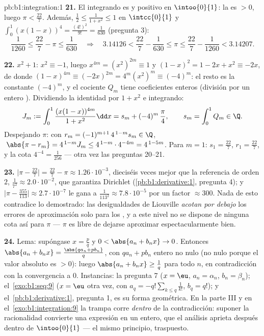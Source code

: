 \begin{solution}{pb:b1:integration:1}
\textbf{21.} El integrando es  y positivo en
$\intoo{0}{1}$: la  es $> 0$, luego $\pi < \frac{22}{7}$.
Además, $\frac12 \leq \frac{1}{1+x^2} \leq 1$ en $\intcc{0}{1}$ y
$\int_0^1 (x(1-x))^4 = \frac{(4!)^2}{9!} = \frac{1}{630}$
(pregunta 3):
\[
\frac{1}{1260} \leq \frac{22}{7} - \pi \leq \frac{1}{630}
\quad\Longrightarrow\quad
3.14126 < \frac{22}{7} - \frac{1}{630} \leq \pi \leq
\frac{22}{7} - \frac{1}{1260} < 3.14207 .
\]

\textbf{22.}  $x^2 + 1$: $x^2 \equiv -1$, luego
$x^{4m} = (x^2)^{2m} \equiv 1$ y
$(1 - x)^2 = 1 - 2x + x^2 \equiv -2x$, de donde
$(1-x)^{4m} \equiv (-2x)^{2m} = 4^m (x^2)^m \equiv (-4)^m$: el resto
es la constante $(-4)^m$, y el cociente $Q_m$ tiene coeficientes
enteros (división por un  entero ). Dividiendo la
identidad por $1 + x^2$ e integrando:
\[
J_m := \int_0^1 \frac{(x(1-x))^{4m}}{1+x^2}\dd x
= s_m + (-4)^m\,\frac{\pi}{4},
\qquad s_m = \int_0^1 Q_m \in \Q .
\]
Despejando $\pi$: con $r_m = (-1)^{m+1}\,4^{\,1-m} s_m \in \Q$,
$\;\abs{\pi - r_m} = 4^{\,1-m} J_m \leq 4^{\,1-m}\cdot4^{-4m} =
4^{\,1-5m}$. Para $m = 1$: $s_1 = \frac{22}{7}$,
$r_1 = \frac{22}{7}$, y la cota $4^{-4} = \frac{1}{256}$ --- otra
vez las preguntas 20--21.

\textbf{23.} $\bigl|\pi - \frac{22}{7}\bigr| = \frac{22}{7} -
\pi \approx 1.26\cdot10^{-3}$, dieciséis veces mejor que la
referencia de orden $2$, $\frac{1}{7^2} \approx 2.0\cdot10^{-2}$,
que garantiza Dirichlet (\cref{pb:b1:derivative:1}, pregunta 4); y
$\bigl|\pi - \frac{355}{113}\bigr| \approx 2.7\cdot10^{-7}$ le gana
a $\frac{1}{113^2} \approx 7.8\cdot10^{-5}$ por un factor
$\approx 300$. Nada de esto contradice lo demostrado: las
desigualdades de Liouville \emph{acotan por debajo} los errores de
aproximación solo para los , y a este nivel no se
dispone de ninguna cota así para $\pi$ --- $\pi$ es libre de dejarse
aproximar espectacularmente bien.

\textbf{24.} Lema: supóngase $x = \frac pq$ y
$0 < \abs{a_n + b_n x} \to 0$. Entonces
$\abs{a_n + b_n x} = \frac{\abs{q a_n + p b_n}}{q}$, con
$q a_n + p b_n$ entero no nulo (no nulo porque el valor absoluto es
$> 0$): luego $\abs{a_n + b_n x} \geq \frac1q$ para todo $n$, en
contradicción con la convergencia a $0$. Instancias: la pregunta 7
($x = \eu$, $a_n = \alpha_n$, $b_n = \beta_n$);
el~\cref{exo:b1:seq:9} ($x = \eu$ otra vez, con
$a_q = -q!\sum_{k \leq q}\frac{1}{k!}$, $b_q = q!$); y
el~\cref{pb:b1:derivative:1}, pregunta 1, es su forma geométrica. En
la parte III y en el~\cref{exo:b1:integration:9} la trampa corre
\emph{dentro} de la contradicción: suponer la racionalidad convierte
una expresión en un entero, que el análisis aprieta después dentro de
$\intoo{0}{1}$ --- el mismo principio, traspuesto.


\end{solution}
